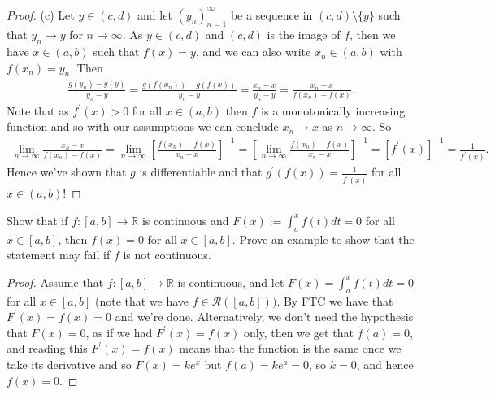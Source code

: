 \documentclass[oneside]{amsart}
\theoremstyle{definition}
\newcommand{\rr}{\mathbb R}
\newcommand{\pp}{\prime}
\begin{document}
\begin{tcolorbox}[colback=black!5!white,colframe=black!75!black,title= Exercise $1.3.$]
\begin{proof}
(c) Let $y \in (c,d)$ and let $(y_n)_{n=1}^\infty$ be a sequence in $(c,d)\setminus \{y \}$ such that $y_n \to y$ for $n \to \infty$. As $y \in (c,d)$ and $(c,d)$ is the image of $f$, then we have $x \in (a,b)$ such that $f(x) = y$, and we can also write $x_n \in (a,b)$ with $f(x_n) = y_n$. Then 
\begin{align*}
	\frac{g(y_n) -g(y)}{y_n-y} = \frac{g(f(x_n)) -g(f(x))}{y_n-y} = \frac{x_n -x}{y_n-y} = \frac{x_n - x}{f(x_n)-f(x)}.
\end{align*} Note that as $f ^\prime (x) > 0$ for all $x \in (a,b)$ then $f$ is a monotonically increasing function and so with our assumptions we can conclude $x_n \to x$ as $n \to \infty$. So 
\begin{align*}
	\lim_{n \to \infty} \frac{x_n - x}{f(x_n) -f(x)} = \lim_{n \to \infty} \left [ \frac{f(x_n) -f(x)}{x_n-x} \right ]^{-1} =  \left [\lim_{n \to \infty}  \frac{f(x_n) -f(x)}{x_n-x} \right ]^{-1} = [f^\pp (x) ]^{-1} = \frac{1}{f^\pp(x)}.
\end{align*} Hence we've shown that $g$ is differentiable and that $g^\pp (f(x))=\frac{1}{f^\pp(x)}$ for all $x \in (a,b)$!
\end{proof}
\end{tcolorbox}



\begin{tcolorbox}[colback=black!5!white,colframe=black!75!black,title= Exercise $2.2.$]  Show that if $f \colon [a,b] \to \rr$ is continuous and $F(x):= \int_a^x f(t)dt = 0$ for all $x \in [a,b]$, then $f(x) =0$ for all $x \in [a,b]$. Prove an example to show that the statement may fail if $f$ is not continuous. 
\tcblower 
\begin{proof} Assume that $f \colon [a,b] \to \rr$ is continuous, and let $F(x) =\int_a^x f(t) dt = 0$ for all $x \in [a,b]$ (note that we have $f \in \mathcal R([a,b]))$. By FTC we have that $F^\prime (x)  = f (x) =0$ and we're done. Alternatively, we don't need the hypothesis that $F(x) = 0$, as if we had $F^\prime (x) = f(x)$ only, then we get that $f(a) = 0$, and reading this $F^\prime (x) = f(x)$ means that the function is the same once we take its derivative and so $F(x) = ke^x$ but $f(a) = ke^a = 0$, so $k = 0$, and hence $f (x) = 0$. 
\end{proof}
\end{tcolorbox}
\end{document}
